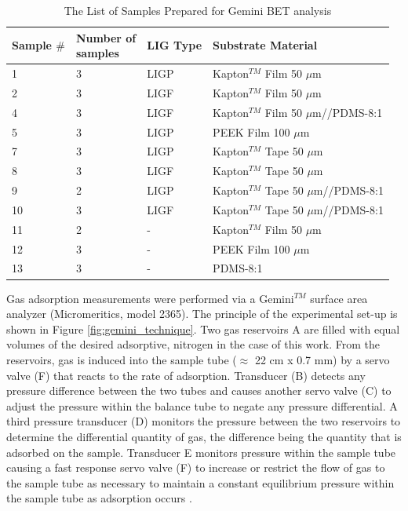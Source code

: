 \begin{table}[H]
\centering
    \caption{The List of Samples Prepared for Gemini  BET analysis}
    \label{tab:borghi_samples} 
\medskip
\medskip
\begin{tabular}{ l | l | l | l  } 


	Sample $\#$ & \pbox{60 pt}{Number of\\ samples} & LIG Type\footnotemark[1] & Substrate Material\\ 
	\hline
	1 & 3 & LIGP & Kapton$^{TM}$ Film 50 $\mu$m\\ [13px]
	2 & 3 & LIGF & Kapton$^{TM}$ Film 50 $\mu$m\\ [13px]
	4 & 3 & LIGF & Kapton$^{TM}$ Film 50 $\mu$m//PDMS-8:1\\ [13px]\hline
	5 & 3 & LIGP & PEEK Film 100 $\mu$m\\ [13px]\hline
	7 & 3 & LIGP & Kapton$^{TM}$ Tape 50 $\mu$m\\ [13px]
	8 & 3 & LIGF & Kapton$^{TM}$ Tape 50 $\mu$m\\ [13px]
	9 & 2 & LIGP & Kapton$^{TM}$ Tape 50 $\mu$m//PDMS-8:1\\ [13px]
	10 & 3 & LIGF & Kapton$^{TM}$ Tape 50 $\mu$m//PDMS-8:1\\ [13px]\hline
	11\footnotemark[2] & 2 & - & Kapton$^{TM}$ Film 50 $\mu$m\\ [13px]
	12\footnotemark[2] & 3 & - & PEEK Film 100 $\mu$m\\ [13px]
	13\footnotemark[2] & 3 & - & PDMS-8:1\\[13px]

\end{tabular}
\end{table}




Gas adsorption measurements were performed via a Gemini$^{TM}$ surface area analyzer (Micromeritics, model 2365). The principle of the experimental set-up is shown in Figure \ref{fig:gemini_technique}. Two gas reservoirs A are filled with equal volumes of the desired adsorptive, nitrogen in the case of this work. From the reservoirs, gas is induced into the sample tube ($\approx$ 22 cm x 0.7 mm) by a servo valve (F) that reacts to the rate of adsorption. Transducer (B) detects any pressure difference between the two tubes and causes another servo valve (C) to adjust the pressure within the balance tube to negate any pressure differential. A third pressure transducer (D) monitors the pressure between the two reservoirs to determine the differential quantity of gas, the difference being the quantity that is adsorbed on the sample. Transducer E monitors pressure within the sample tube causing a fast response servo valve (F) to increase or restrict the flow of gas to the sample tube as necessary to maintain a constant equilibrium pressure within the sample tube as adsorption occurs \cite{gemini_brochure}.



